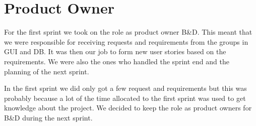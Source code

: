 \section{Product Owner} \label{Sprint1_SecProductOwner}
For the first sprint we took on the role as product owner B\&D. This meant that we were responsible for receiving requests and requirements from the groups in GUI and DB. It was then our job to form new user stories based on the requirements. We were also the ones who handled the sprint end and the planning of the next sprint.

In the first sprint we did only got a few request and requirements but this was probably because a lot of the time  allocated to the first sprint was used to get knowledge about the project. We decided to keep the role as product owners for B\&D during the next sprint.